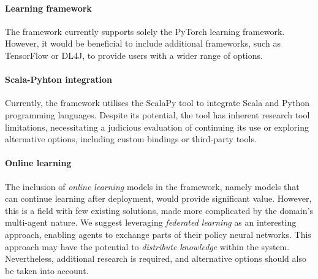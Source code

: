 \documentclass[12pt,a4paper,openright,twoside]{book}
\begin{document}
\paragraph{Learning framework}
The framework currently supports solely the PyTorch learning framework. However, it would be beneficial 
    to include additional frameworks, such as TensorFlow \cite{abadi2016tensorflow} or DL4J, to provide users with 
    a wider range of options.

\paragraph{Scala-Pyhton integration}
Currently, the framework utilises the ScalaPy tool to integrate Scala and Python programming languages. 
    Despite its potential, the tool has inherent research tool limitations, necessitating a judicious evaluation 
    of continuing its use or exploring alternative options, including custom bindings or third-party tools.

\paragraph{Online learning}
The inclusion of \emph{online learning} models in the framework, namely models that can continue learning after 
    deployment, would provide significant value. However, this is a field with few existing solutions, 
    made more complicated by the domain's multi-agent nature. We suggest leveraging 
    \emph{federated learning} \cite{zhang2021survey, abdulrahman2020survey} as an interesting approach, 
    enabling agents to exchange parts of their policy neural networks. 
    This approach may have the potential to \emph{distribute knowledge} within the system. 
    Nevertheless, additional research is required, and alternative options should also be taken into account.





\end{document}
